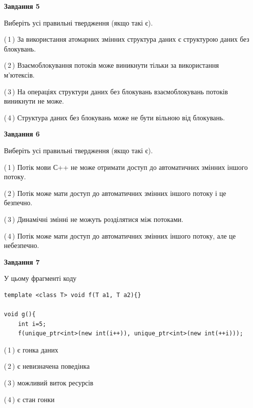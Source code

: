 \documentclass[12pt, ukrainian]{article}
\begin{document}
\begin {large}
{\begin{center}
\textbf{Завдання 5}
\end{center}

Виберіть усі правильні твердження (якщо такі є).\par
\vspace{2mm}

(\,1\,) За використання атомарних змінних структура даних є структурою даних без блокувань.%

(\,2\,) Взаємоблокування потоків може виникнути тільки за використання м’ютексів.%

(\,3\,) На операціях структури даних без блокувань взаємоблокувань потоків виникнути не може.%

(\,4\,) Структура даних без блокувань може не бути вільною від блокувань.%
\newpage


\begin{center}
\textbf{Завдання 6}
\end{center}

Виберіть усі правильні твердження (якщо такі є).\par
\vspace{2mm}

(\,1\,) Потік мови С++ не може отримати доступ до автоматичних змінних іншого потоку.%

(\,2\,) Потік може мати доступ до автоматичних змінних іншого потоку і це безпечно.%

(\,3\,) Динамічні змінні не можуть розділятися між потоками.%

(\,4\,) Потік може мати доступ до автоматичних змінних іншого потоку, але це небезпечно.%


\begin{center}
\textbf{Завдання 7}
\end{center}

У цьому фрагменті коду
\begin{verbatim}
template <class T> void f(T a1, T a2){}

void g(){
    int i=5;
    f(unique_ptr<int>(new int(i++)), unique_ptr<int>(new int(++i)));
\end{verbatim}

(\,1\,) є гонка даних%

(\,2\,) є невизначена поведінка%

(\,3\,) можливий виток ресурсів%

(\,4\,) є стан гонки%

}
\end {large}

\vspace{4mm}
\newpage
\end{document}
